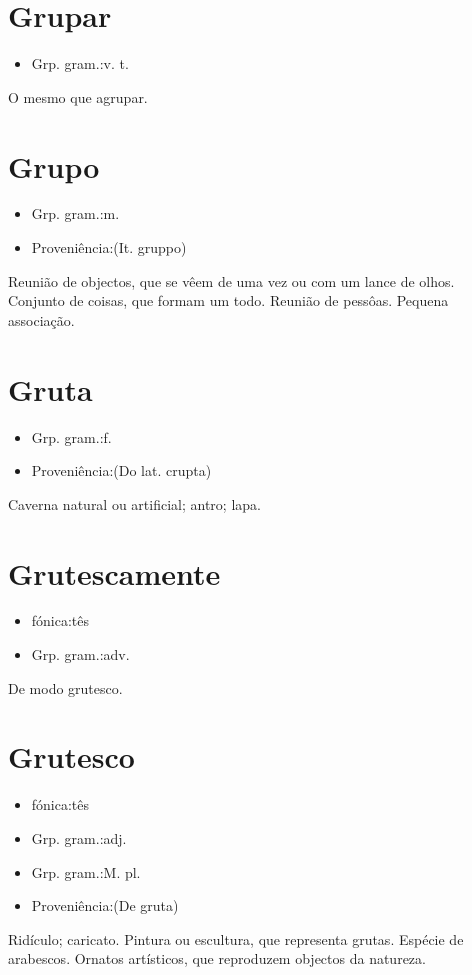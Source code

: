 \section{Grupar}
\begin{itemize}
\item {Grp. gram.:v. t.}
\end{itemize}
O mesmo que \textunderscore agrupar\textunderscore .
\section{Grupo}
\begin{itemize}
\item {Grp. gram.:m.}
\end{itemize}
\begin{itemize}
\item {Proveniência:(It. \textunderscore gruppo\textunderscore )}
\end{itemize}
Reunião de objectos, que se vêem de uma vez ou com um lance de olhos.
Conjunto de coisas, que formam um todo.
Reunião de pessôas.
Pequena associação.
\section{Gruta}
\begin{itemize}
\item {Grp. gram.:f.}
\end{itemize}
\begin{itemize}
\item {Proveniência:(Do lat. \textunderscore crupta\textunderscore )}
\end{itemize}
Caverna natural ou artificial; antro; lapa.
\section{Grutescamente}
\begin{itemize}
\item {fónica:tês}
\end{itemize}
\begin{itemize}
\item {Grp. gram.:adv.}
\end{itemize}
De modo grutesco.
\section{Grutesco}
\begin{itemize}
\item {fónica:tês}
\end{itemize}
\begin{itemize}
\item {Grp. gram.:adj.}
\end{itemize}
\begin{itemize}
\item {Grp. gram.:M. pl.}
\end{itemize}
\begin{itemize}
\item {Proveniência:(De \textunderscore gruta\textunderscore )}
\end{itemize}
Ridículo; caricato.
Pintura ou escultura, que representa grutas.
Espécie de arabescos.
Ornatos artísticos, que reproduzem objectos da natureza.
